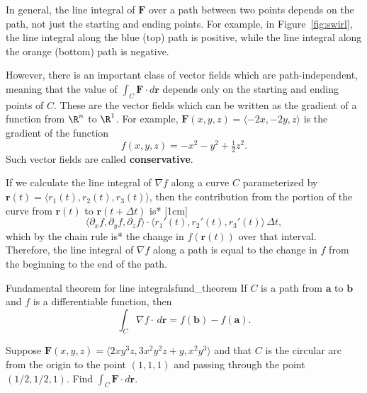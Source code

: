 \documentclass[indent]{watsonbook}
\begin{document}
In general, the line integral of $\mathbf{F}$ over a path between two
points depends on the path, not just the starting and ending points.
For example, in Figure~\ref{fig:swirl}, the line integral along the
blue (top) path is positive, while the line integral along the orange
(bottom) path is negative.

However, there is an important class of vector fields which are
path-independent, meaning that the value of $\int_C \mathbf{F} \cdot
{d}\mathbf{r}$ depends only on the starting and ending points of $C$.
These are the vector fields which can be written as the gradient of a
function from $\R^n$ to $\R^1$. For example, $\mathbf{F}(x,y,z) =
\langle -2x, -2y, z \rangle$ is the gradient of the function
\[
  f(x,y,z) = -x^2-y^2 + \tfrac{1}{2}z^2.
\]
Such vector fields are called \textbf{conservative}.

If we calculate the line integral of $\nabla f$ along a curve $C$
parameterized by $\mathbf{r}(t) = \langle r_1(t), r_2(t), r_3(t) \rangle$,
then the contribution from the portion of the curve from
$\mathbf{r}(t)$ to $\mathbf{r}(t+\Delta t)$ is*
[1cm]
\[
  \langle \partial_x f, \partial_y f, \partial_z f \rangle \cdot
  \langle r_1'(t), r_2'(t), r_3'(t) \rangle \, \Delta t,
\]
which by the chain rule is* the change in $f(\mathbf{r}(t))$ over that
interval. Therefore, the line integral of $\nabla f$ along a path is
equal to the change in $f$ from the beginning to the end of the path.

\begin{theo}{Fundamental theorem for line integrals}{fund_theorem}
  If $C$ is a path from $\mathbf{a}$ to $\mathbf{b}$ and $f$ is a
  differentiable function, then
  \[
    \int_C \nabla f \cdot \, {{d}}\mathbf{r} = f(\mathbf{b}) - f(\mathbf{a}).
  \]
\end{theo}

\begin{example}{}{}
  Suppose $\mathbf{F}(x,y,z) = \langle 2  x y^{3} z, 3  x^{2} y^{2}
  z + y, x^{2} y^{3} \rangle$ and that $C$ is the circular arc from the
  origin to the point $(1,1,1)$ and passing through the point
  $(1/2,1/2,1)$. Find $\int_C \mathbf{F} \cdot d \mathbf{r}$.
\end{example}
\end{document}
